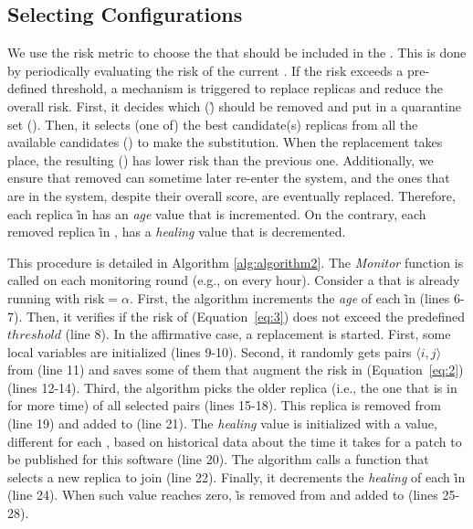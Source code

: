 \subsection*{Selecting Configurations}
\label{sec:configurations}


We use the risk metric to choose the \replicas that should be included in the \configuration. 
This is done by periodically evaluating the risk of the current \configuration. 
If the risk exceeds a pre-defined threshold, a mechanism is triggered to replace replicas and reduce the overall risk.
First, it decides which \replica (\r) should be removed and put in a quarantine set (\QS). 
Then, it selects (one of) the best candidate(s) replicas from all the available candidates (\RS) to make the substitution.
When the replacement takes place, the resulting \configuration (\ES) has lower risk than the previous one.
Additionally, we ensure that removed \replicas can sometime later re-enter the system, and the ones that are in the system, despite their overall score, are eventually replaced.
Therefore, each replica \r in \ES has an \emph{age} value that is incremented. 
On the contrary, each removed replica \r in \QS, has a \emph{healing} value that is decremented.


This procedure is detailed in Algorithm \ref{alg:algorithm2}.
The \emph{Monitor} function is called on each monitoring round (e.g., on every hour).
Consider a \ES that is already running with risk$=\alpha$.
First, the algorithm increments the \emph{age} of each \r in \ES (lines 6-7).
Then, it verifies if the risk of \ES (Equation~\ref{eq:3}) does not exceed the predefined $\mathit{threshold}$ (line 8).
In the affirmative case, a \replica replacement is started.
First, some local variables are initialized (lines 9-10).
Second, it randomly gets pairs $\langle i,j \rangle$ from \ES (line 11) and saves some of them that augment the risk in \MAX (Equation~\ref{eq:2}) (lines 12-14). 
Third, the algorithm picks the older replica (i.e., the one that is in \ES for more time) of all selected pairs (lines 15-18). 
This replica is removed from \ES (line 19) and added to \QS (line 21).
The \emph{healing} value is initialized with a value, different for each \replica, based on historical data about the time it takes for a patch to be published for this software (line 20). 
The algorithm calls a function that selects a new replica to join \ES (line 22). Finally, it decrements the \emph{healing} of each \r in \QS (line 24). When such value reaches zero, \r is removed from \QS and added to \RS (lines 25-28).


